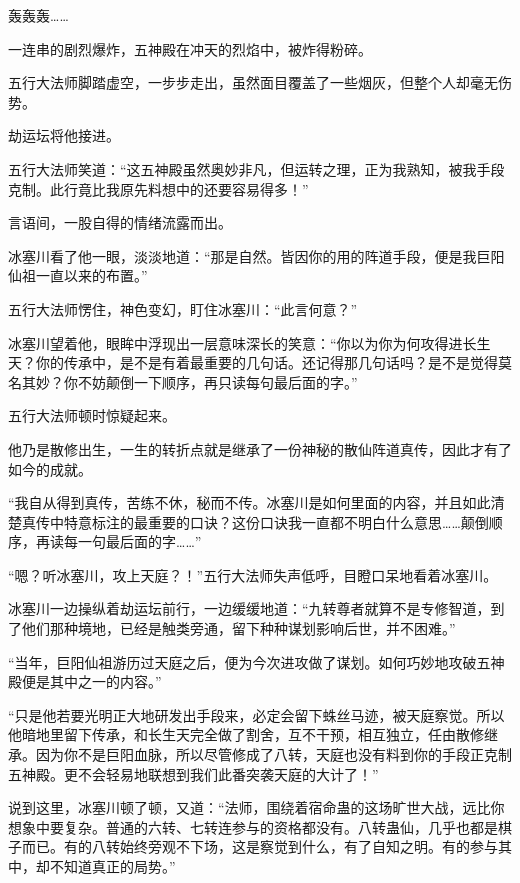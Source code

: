 
\begin{this_body}

轰轰轰……

一连串的剧烈爆炸，五神殿在冲天的烈焰中，被炸得粉碎。

五行大法师脚踏虚空，一步步走出，虽然面目覆盖了一些烟灰，但整个人却毫无伤势。

劫运坛将他接进。

五行大法师笑道：“这五神殿虽然奥妙非凡，但运转之理，正为我熟知，被我手段克制。此行竟比我原先料想中的还要容易得多！”

言语间，一股自得的情绪流露而出。

冰塞川看了他一眼，淡淡地道：“那是自然。皆因你的用的阵道手段，便是我巨阳仙祖一直以来的布置。”

五行大法师愣住，神色变幻，盯住冰塞川：“此言何意？”

冰塞川望着他，眼眸中浮现出一层意味深长的笑意：“你以为你为何攻得进长生天？你的传承中，是不是有着最重要的几句话。还记得那几句话吗？是不是觉得莫名其妙？你不妨颠倒一下顺序，再只读每句最后面的字。”

五行大法师顿时惊疑起来。

他乃是散修出生，一生的转折点就是继承了一份神秘的散仙阵道真传，因此才有了如今的成就。

“我自从得到真传，苦练不休，秘而不传。冰塞川是如何里面的内容，并且如此清楚真传中特意标注的最重要的口诀？这份口诀我一直都不明白什么意思……颠倒顺序，再读每一句最后面的字……”

“嗯？听冰塞川，攻上天庭？！”五行大法师失声低呼，目瞪口呆地看着冰塞川。

冰塞川一边操纵着劫运坛前行，一边缓缓地道：“九转尊者就算不是专修智道，到了他们那种境地，已经是触类旁通，留下种种谋划影响后世，并不困难。”

“当年，巨阳仙祖游历过天庭之后，便为今次进攻做了谋划。如何巧妙地攻破五神殿便是其中之一的内容。”

“只是他若要光明正大地研发出手段来，必定会留下蛛丝马迹，被天庭察觉。所以他暗地里留下传承，和长生天完全做了割舍，互不干预，相互独立，任由散修继承。因为你不是巨阳血脉，所以尽管修成了八转，天庭也没有料到你的手段正克制五神殿。更不会轻易地联想到我们此番突袭天庭的大计了！”

说到这里，冰塞川顿了顿，又道：“法师，围绕着宿命蛊的这场旷世大战，远比你想象中要复杂。普通的六转、七转连参与的资格都没有。八转蛊仙，几乎也都是棋子而已。有的八转始终旁观不下场，这是察觉到什么，有了自知之明。有的参与其中，却不知道真正的局势。”


\end{this_body}
